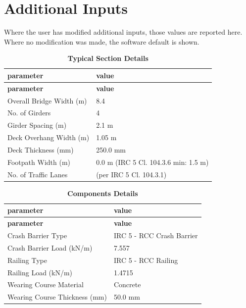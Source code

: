 \documentclass[12pt,a4paper]{report}
\numberwithin{table}{chapter}
\numberwithin{figure}{chapter}
\begin{document}
\newpage
\section{Additional Inputs}
\label{sec:additional-inputs}

Where the user has modified additional inputs, those values are reported here. Where no modification was made, the software default is shown.

\vspace{0.8cm}

\begin{longtable}{|L{5.5cm}|p{10.0cm}|}
\caption{\textbf{Typical Section Details}}
\hline
\textbf{parameter} & \textbf{value} \\
\hline
\endfirsthead
\textbf{parameter} & \textbf{value} \\
\hline
\endhead
\textnormal{Overall Bridge Width (m)} & 8.4 \\[6pt]
\hline
\textnormal{No. of Girders} & 4 \\[6pt]
\hline
\textnormal{Girder Spacing (m)} & 2.1 m \\[6pt]
\hline
\textnormal{Deck Overhang Width (m)} & 1.05 m \\[6pt]
\hline
\textnormal{Deck Thickness (mm)} & 250.0 mm \\[6pt]
\hline
\textnormal{Footpath Width (m)} & 0.0 m (IRC 5 Cl. 104.3.6 min: 1.5 m) \\[6pt]
\hline
\textnormal{No. of Traffic Lanes} &  (per IRC 5 Cl. 104.3.1) \\[6pt]
\hline
\end{longtable}

\vspace{0.8em}

\begin{longtable}{|L{5.5cm}|p{10.0cm}|}
\caption{\textbf{Components Details}}
\hline
\textbf{parameter} & \textbf{value} \\
\hline
\endfirsthead
\textbf{parameter} & \textbf{value} \\
\hline
\endhead
\textnormal{Crash Barrier Type} & IRC 5 - RCC Crash Barrier \\[6pt]
\hline
\textnormal{Crash Barrier Load (kN/m)} & 7.557 \\[6pt]
\hline

\textnormal{Railing Type} & IRC 5 - RCC Railing \\[6pt]
\hline
\textnormal{Railing Load (kN/m)} & 1.4715 \\[6pt]
\hline
\textnormal{Wearing Course Material} & Concrete \\[6pt]
\hline
\textnormal{Wearing Course Thickness (mm)} & 50.0 mm \\[6pt]
\hline
\end{longtable}
\end{document}
